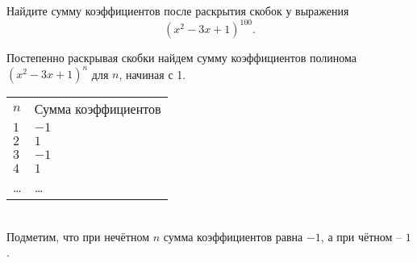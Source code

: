 
Найдите сумму коэффициентов после раскрытия скобок у выражения $$(x^2-3x+1)^{100}.$$

\soultionSection

Постепенно раскрывая скобки найдем сумму коэффициентов полинома \linebreak $(x^2-3x+1)^n$ для $n$, начиная с 1.\\

\begin{tabular}{l l}
    $n$ & Сумма коэффициентов \\
    $1$ & $-1$  \\
    $2$ & $1$  \\
    $3$ & $-1$  \\
    $4$ & $1$  \\
    \dots & \dots \\
\end{tabular}\\

Подметим, что при нечётном $n$ сумма коэффициентов равна $-1$, а при \linebreak чётном -- $1$.

